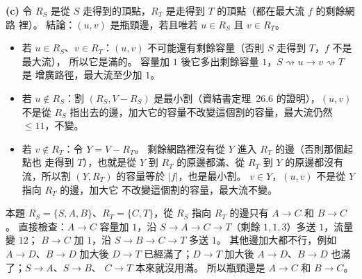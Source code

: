 \begin{pastsoln}
\textbf{(c)} 令 $R_S$ 是從 $S$ 走得到的頂點，$R_T$ 是走得到 $T$ 的頂點（都在最大流 $f$ 的剩餘網路
裡）。 結論：$(u, v)$ 是瓶頸邊，若且唯若 $u \in R_S$ 且 $v \in R_T$。
\begin{itemize}
\item 若 $u \in R_S$、$v \in R_T$：$(u, v)$ 不可能還有剩餘容量（否則 $S$ 走得到 $T$，$f$ 不是最大流），
所以它是滿的。 容量加 $1$ 後它多出剩餘容量 $1$，$S \rightsquigarrow u \to v \rightsquigarrow T$ 是
增廣路徑，最大流至少加 $1$。
\item 若 $u \notin R_S$：割 $(R_S, V - R_S)$ 是最小割（資結書定理~26.6 的證明），$(u, v)$ 不是從
$R_S$ 指出去的邊，加大它的容量不改變這個割的容量，最大流仍然 $\le 11$，不變。
\item 若 $v \notin R_T$：令 $Y = V - R_T$。 剩餘網路裡沒有從 $Y$ 進入 $R_T$ 的邊（否則那個起點也
走得到 $T$），也就是從 $Y$ 到 $R_T$ 的原邊都滿、從 $R_T$ 到 $Y$ 的原邊都沒有流，所以割
$(Y, R_T)$ 的容量等於 $|f|$，也是最小割。 $v \in Y$，$(u, v)$ 不是從 $Y$ 指向 $R_T$ 的邊，加大它
不改變這個割的容量，最大流不變。
\end{itemize}
本題 $R_S = \{S, A, B\}$、$R_T = \{C, T\}$，從 $R_S$ 指向 $R_T$ 的邊只有 $A \to C$ 和 $B \to C$。
直接檢查：$A \to C$ 容量加 $1$，沿 $S \to A \to C \to T$（剩餘 $1, 1, 3$）多送 $1$，流量變 $12$；
$B \to C$ 加 $1$，沿 $S \to B \to C \to T$ 多送 $1$。 其他邊加大都不行，例如 $A \to D$、$B \to D$
加大後 $D \to T$ 已經滿了；$D \to T$ 加大後 $A \to D$、$B \to D$ 也滿了；$S \to A$、$S \to B$、
$C \to T$ 本來就沒用滿。 所以瓶頸邊是 $A \to C$ 和 $B \to C$。
\end{pastsoln}
